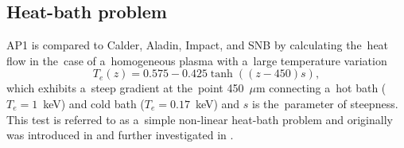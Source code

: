 \subsection{Heat-bath problem}  
\label{sec:heatbath_test}
AP1 is compared to Calder, Aladin, Impact, and SNB by 
calculating the~heat flow in the~case of a~homogeneous plasma
with a~large temperature variation
\begin{equation}
  T_e(z) = 0.575 - 0.425 \tanh\left((z-450) s\right) ,
  \label{eq:T_init}
\end{equation}
which exhibits a~steep gradient at the~point 450~$\mu$m 
connecting a~hot bath ($T_e = 1$~keV) 
and cold bath ($T_e = 0.17$~keV) and $s$ is the~parameter of steepness. 
This test is referred to as a~simple non-linear heat-bath problem and
originally was introduced in \cite{marocchino2013} and further investigated
in  \cite{Sorbo_2015, Sorbo_2016, Sherlock_PoP2017, Brodrick_PoP2017}.
